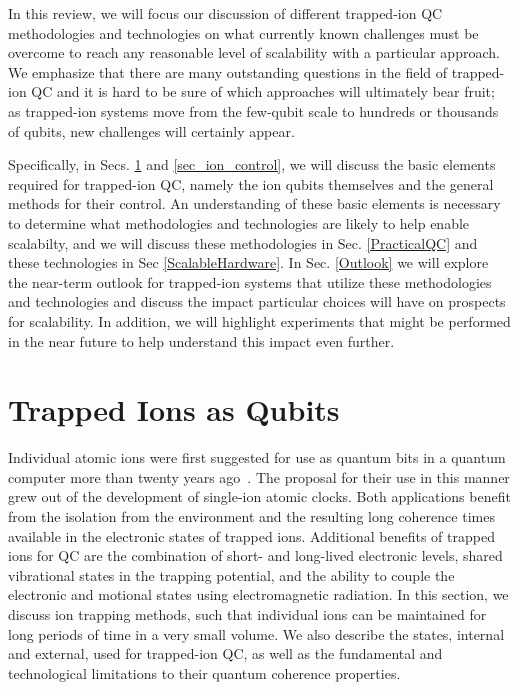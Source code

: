 \documentclass[%
reprint,
 amsmath,amssymb,
]{revtex4-1}
\begin{document}
In this review, we will focus our discussion of different trapped-ion QC methodologies and technologies on what currently known challenges must be overcome to reach any reasonable level of scalability with a particular approach. We emphasize that there are many outstanding questions in the field of trapped-ion QC and it is hard to be sure of which approaches will ultimately bear fruit; as trapped-ion systems move from the few-qubit scale to hundreds or thousands of qubits, new challenges will certainly appear.

Specifically, in Secs. \ref{sec_trapped_ion_qubits} and \ref{sec_ion_control}, we will discuss the basic elements required for trapped-ion QC, namely the ion qubits themselves and the general methods for their control. An understanding of these basic elements is necessary to determine what methodologies and technologies are likely to help enable scalabilty, and we will discuss these methodologies in Sec. \ref{PracticalQC} and these technologies in Sec \ref{ScalableHardware}.  In Sec. \ref{Outlook} we will explore the near-term outlook for trapped-ion systems that utilize these methodologies and technologies and discuss the impact particular choices will have on prospects for scalability.  In addition, we will highlight experiments that might be performed in the near future to help understand this impact even further.


\section{Trapped Ions as Qubits}
\label{sec_trapped_ion_qubits}

Individual atomic ions were first suggested for use as quantum bits in a quantum computer more than twenty years ago~\cite{CiracZollerGate}.  The proposal for their use in this manner grew out of the development of single-ion atomic clocks.  Both applications benefit from the isolation from the environment and the resulting long coherence times available in the electronic states of trapped ions.  Additional benefits of trapped ions for QC are the combination of short- and long-lived electronic levels, shared vibrational states in the trapping potential, and the ability to couple the electronic and motional states using electromagnetic radiation.  In this section, we discuss ion trapping methods, such that individual ions can be maintained for long periods of time in a very small volume.  We also describe the states, internal and external, used for trapped-ion QC, as well as the fundamental and technological limitations to their quantum coherence properties.
\end{document}
